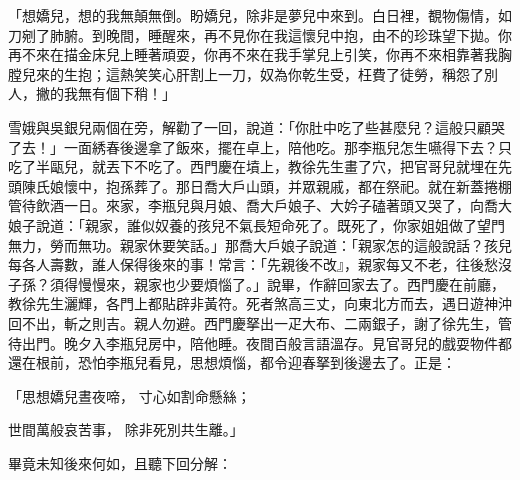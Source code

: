 \begin{showcontents}{}
「想嬌兒，想的我無顛無倒。盼嬌兒，除非是夢兒中來到。白日裡，覩物傷情，如刀剜了肺腑。到晚間，睡醒來，再不見你在我這懷兒中抱，由不的珍珠望下拋。你再不來在描金床兒上睡著頑耍，你再不來在我手掌兒上引笑，你再不來相靠著我胸膛兒來的生抱；這熱笑笑心肝割上一刀，奴為你乾生受，枉費了徒勞，稱怨了別人，撇的我無有個下稍！」

雪娥與吳銀兒兩個在旁，解勸了一回，說道：「你肚中吃了些甚麼兒？這般只顧哭了去！」一面綉春後邊拿了飯來，擺在卓上，陪他吃。那李瓶兒怎生嚥得下去？只吃了半甌兒，就丟下不吃了。西門慶在墳上，教徐先生畫了穴，把官哥兒就埋在先頭陳氏娘懷中，抱孫葬了。那日喬大戶山頭，并眾親戚，都在祭祀。就在新蓋捲棚管待飲酒一日。來家，李瓶兒與月娘、喬大戶娘子、大妗子磕著頭又哭了，向喬大娘子說道：「親家，誰似奴養的孩兒不氣長短命死了。既死了，你家姐姐做了望門無力，勞而無功。親家休要笑話。」那喬大戶娘子說道：「親家怎的這般說話？孩兒每各人壽數，誰人保得後來的事！常言：「先親後不改』，親家每又不老，往後愁沒子孫？須得慢慢來，親家也少要煩惱了。」說畢，作辭回家去了。西門慶在前廳，教徐先生灑輝，各門上都貼辟非黃符。死者煞高三丈，向東北方而去，遇日遊神沖回不出，斬之則吉。親人勿避。西門慶拏出一疋大布、二兩銀子，謝了徐先生，管待出門。晚夕入李瓶兒房中，陪他睡。夜間百般言語溫存。見官哥兒的戲耍物件都還在根前，恐怕李瓶兒看見，思想煩惱，都令迎春拏到後邊去了。正是：

「思想嬌兒晝夜啼，  寸心如割命懸絲；

世間萬般哀苦事，  除非死別共生離。」

畢竟未知後來何如，且聽下回分解：




\end{showcontents}


